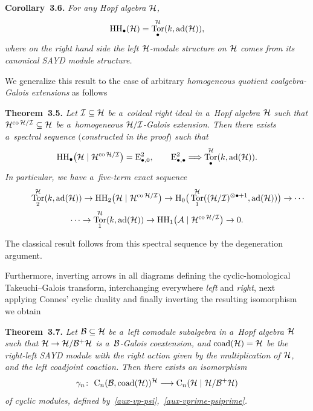 \documentclass[pdftex]{sigma}
\numberwithin{equation}{section}
\DeclareMathOperator{\ad}{ad}
\DeclareMathOperator{\co}{co}
\DeclareMathOperator{\Tor}{Tor}
\begin{document}
\smallskip

\noindent\textbf{Corollary~3.6.} \emph{For any Hopf algebra ${\cal H}$,
\begin{gather*}
{\rm HH}_\bullet({\cal H})=\Tor^{{\cal H}}_{\bullet}(k, \ad({\cal H})),
\end{gather*}
where on the right hand side the left ${\cal H}$-module structure on ${\cal H}$ comes from its canonical SAYD module structure.}

\smallskip

We generalize this result to the case of arbitrary \emph{homogeneous quotient coalgebra-Galois extensions} as follows

\smallskip

\noindent\textbf{Theorem~3.5.} \emph{Let ${\cal I}\subseteq {\cal H}$ be a~coideal right ideal in a~Hopf algebra ${\cal H}$
such that ${\cal H}^{\co{\cal H}/{\cal I}}\subseteq {\cal H}$ be a~homogeneous ${\cal H}/{\cal I}$-Galois extension.
Then there exists a~spectral sequence $($constructed in the proof$)$ such that
\begin{gather*}
{\rm HH}_\bullet\big({\cal H}\mid {\cal H}^{\co{\cal H}/{\cal I}}\big)={\rm E}^2_{\bullet,0},
\qquad
{\rm E}^2_{\bullet,\bullet}\Longrightarrow \Tor^{{\cal H}}_{\bullet}(k, \ad({\cal H})).
\end{gather*}
In particular, we have a~five-term exact sequence}
\begin{gather*}
\phantom{\dots\to }
\Tor^{{\cal H}}_2(k,\ad({\cal H}))\to {\rm HH}_2\big({\cal H}\mid {\cal H}^{\co{\cal H}/{\cal I}}\big)\to
{\rm H}_0\big(\Tor^{{\cal H}}_1(({\cal H}/{\cal I})^{\otimes\bullet +1},\ad({\cal H}))\big) \to \cdots
\\
\cdots\to \Tor^{{\cal H}}_1(k, \ad({\cal H})) \to {\rm HH}_1\big({\cal A}\mid {\cal H}^{\co{\cal H}/{\cal I}}\big) \to 0.
\end{gather*}

\smallskip

The classical result follows from this spectral sequence by the degeneration argument.

Furthermore, inverting arrows in all diagrams def\/ining the cyclic-homological Takeuchi--Galois transform, interchanging
everywhere \emph{left} and \emph{right}, next applying Connes' cyclic duality and f\/inally inverting the resulting isomorphism we obtain

\smallskip

\noindent\textbf{Theorem~3.7.} \emph{Let ${\cal B}\subseteq {\cal H}$ be a~left comodule subalgebra in a~Hopf algebra
${\cal H}$ such that ${\cal H}\rightarrow {\cal H}/{\cal B}^{+}{\cal H}$ is a~${\cal B}$-Galois coextension, and ${\rm
coad}({\cal H})={\cal H}$ be the right-left SAYD module with the right action given by the multiplication of ${\cal H}$,
and the left coadjoint coaction.
Then there exists an isomorphism
\begin{gather*}
\gamma_{n}\colon \ {\rm C}_{n}({\cal B}, {\rm coad}({\cal H}))^{{\cal H}} \longrightarrow {\rm C}_{n}({\cal H}\mid {\cal H}/{\cal B}^{+}{\cal H})
\end{gather*}
of cyclic modules, defined by~\eqref{aux-vp-psi},~\eqref{aux-vprime-psiprime}.}
\end{document}
